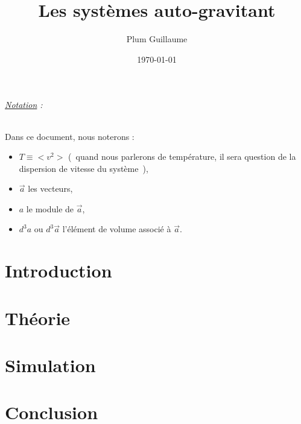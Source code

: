 \documentclass[a4paper,11pt,twoside,openright]{report}
\title{Les systèmes auto-gravitant}
\author{Plum Guillaume}
\date{\today}
\renewcommand{\(}{\ensuremath{\left(}}
\renewcommand{\)}{\ensuremath{\right)}}
\begin{document}
	\dominitoc
	

	\cleardoublepage

	\small \tableofcontents
	\listoffigures
	\listoftables
	\normalsize

	\paragraph*{\underline{Notation} :}
	Dans ce document, nous noterons :
	\begin{itemize}
		\item $T \equiv <v^2>$ (~quand nous parlerons de température, il sera question de la dispersion de vitesse du système~),
		\item $\vec{a}$ les vecteurs,
		\item $a$ le module de $\vec{a}$,
		\item $d^3 a$ ou $d^3 \vec{a}$ l'élément de volume associé à $\vec{a}$.
	\end{itemize}


	\pagestyle{these}


	\part{Introduction}
		

	\part{Théorie}
		


	\part{Simulation}
		

	\part*{Conclusion}
\end{document}

